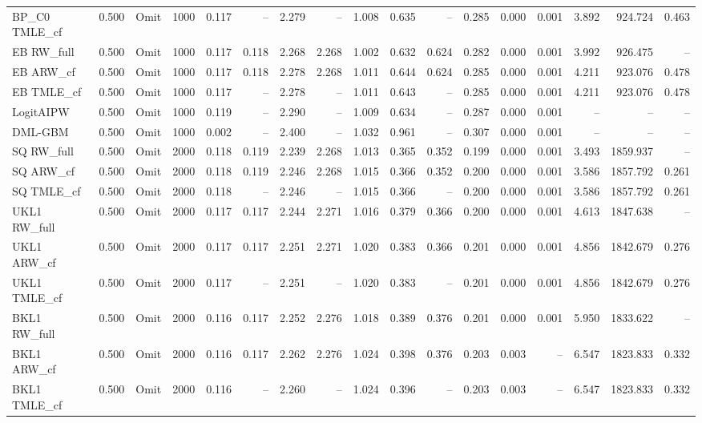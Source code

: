 \begin{tabular}{llllrrrrrrrrrrrrr}
BP\_C0 TMLE\_cf & 0.500 & Omit & 1000 & 0.117 & -- & 2.279 & -- & 1.008 & 0.635 & -- & 0.285 & 0.000 & 0.001 & 3.892 & 924.724 & 0.463 \\
EB RW\_full & 0.500 & Omit & 1000 & 0.117 & 0.118 & 2.268 & 2.268 & 1.002 & 0.632 & 0.624 & 0.282 & 0.000 & 0.001 & 3.992 & 926.475 & -- \\
EB ARW\_cf & 0.500 & Omit & 1000 & 0.117 & 0.118 & 2.278 & 2.268 & 1.011 & 0.644 & 0.624 & 0.285 & 0.000 & 0.001 & 4.211 & 923.076 & 0.478 \\
EB TMLE\_cf & 0.500 & Omit & 1000 & 0.117 & -- & 2.278 & -- & 1.011 & 0.643 & -- & 0.285 & 0.000 & 0.001 & 4.211 & 923.076 & 0.478 \\
LogitAIPW & 0.500 & Omit & 1000 & 0.119 & -- & 2.290 & -- & 1.009 & 0.634 & -- & 0.287 & 0.000 & 0.001 & -- & -- & -- \\
DML-GBM & 0.500 & Omit & 1000 & 0.002 & -- & 2.400 & -- & 1.032 & 0.961 & -- & 0.307 & 0.000 & 0.001 & -- & -- & -- \\
SQ RW\_full & 0.500 & Omit & 2000 & 0.118 & 0.119 & 2.239 & 2.268 & 1.013 & 0.365 & 0.352 & 0.199 & 0.000 & 0.001 & 3.493 & 1859.937 & -- \\
SQ ARW\_cf & 0.500 & Omit & 2000 & 0.118 & 0.119 & 2.246 & 2.268 & 1.015 & 0.366 & 0.352 & 0.200 & 0.000 & 0.001 & 3.586 & 1857.792 & 0.261 \\
SQ TMLE\_cf & 0.500 & Omit & 2000 & 0.118 & -- & 2.246 & -- & 1.015 & 0.366 & -- & 0.200 & 0.000 & 0.001 & 3.586 & 1857.792 & 0.261 \\
UKL1 RW\_full & 0.500 & Omit & 2000 & 0.117 & 0.117 & 2.244 & 2.271 & 1.016 & 0.379 & 0.366 & 0.200 & 0.000 & 0.001 & 4.613 & 1847.638 & -- \\
UKL1 ARW\_cf & 0.500 & Omit & 2000 & 0.117 & 0.117 & 2.251 & 2.271 & 1.020 & 0.383 & 0.366 & 0.201 & 0.000 & 0.001 & 4.856 & 1842.679 & 0.276 \\
UKL1 TMLE\_cf & 0.500 & Omit & 2000 & 0.117 & -- & 2.251 & -- & 1.020 & 0.383 & -- & 0.201 & 0.000 & 0.001 & 4.856 & 1842.679 & 0.276 \\
BKL1 RW\_full & 0.500 & Omit & 2000 & 0.116 & 0.117 & 2.252 & 2.276 & 1.018 & 0.389 & 0.376 & 0.201 & 0.000 & 0.001 & 5.950 & 1833.622 & -- \\
BKL1 ARW\_cf & 0.500 & Omit & 2000 & 0.116 & 0.117 & 2.262 & 2.276 & 1.024 & 0.398 & 0.376 & 0.203 & 0.003 & -- & 6.547 & 1823.833 & 0.332 \\
BKL1 TMLE\_cf & 0.500 & Omit & 2000 & 0.116 & -- & 2.260 & -- & 1.024 & 0.396 & -- & 0.203 & 0.003 & -- & 6.547 & 1823.833 & 0.332 \\

\end{tabular}
